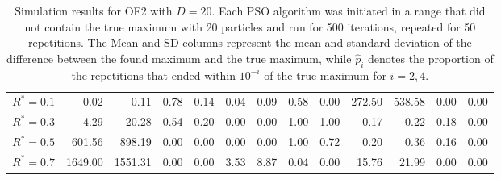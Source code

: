 \documentclass[12pt]{article}
\begin{document}
\begin{table}[ht]
{\begin{tabular}{r|rrrr|rrrr|rrrr}
  $R^* = 0.1$ & 0.02 & 0.11 & 0.78 & 0.14 & 0.04 & 0.09 & 0.58 & 0.00 & 272.50 & 538.58 & 0.00 & 0.00 \\ 
  $R^* = 0.3$ & 4.29 & 20.28 & 0.54 & 0.20 & 0.00 & 0.00 & 1.00 & 1.00 & 0.17 & 0.22 & 0.18 & 0.00 \\ 
  $R^* = 0.5$ & 601.56 & 898.19 & 0.00 & 0.00 & 0.00 & 0.00 & 1.00 & 0.72 & 0.20 & 0.36 & 0.16 & 0.00 \\ 
  $R^* = 0.7$ & 1649.00 & 1551.31 & 0.00 & 0.00 & 3.53 & 8.87 & 0.04 & 0.00 & 15.76 & 21.99 & 0.00 & 0.00 \\ 
   \hline
\end{tabular}
}
\caption{Simulation results for OF2 with $D=20$. Each PSO algorithm was initiated in a range that did not contain the true maximum with 20 particles and run for 500 iterations, repeated for 50 repetitions. The Mean and SD columns represent the mean and standard deviation of the difference between the found maximum and the true maximum, while $\widehat{p}_i$ denotes the proportion of the repetitions that ended within $10^{-i}$ of the true maximum for $i=2,4$.}
\label{tab:psosim2}
\end{table}
\end{document}
